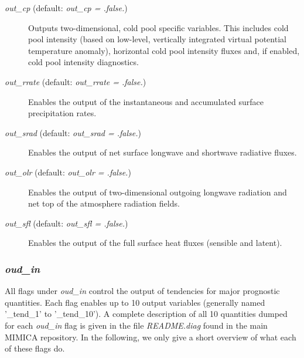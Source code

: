 \documentclass[12pt,A4,french]{article}
\begin{document}
\begin{description}
\item[{\it out\_cp} (default: {\it out\_cp = .false.})]

Outputs two-dimensional, cold pool specific variables. This includes cold pool intensity (based on low-level, vertically integrated virtual potential temperature anomaly), horizontal cold pool intensity fluxes and, if enabled, cold pool intensity diagnostics.

\item[{\it out\_rrate} (default: {\it out\_rrate = .false.})]

Enables the output of the instantaneous and accumulated surface precipitation rates. 

\item[{\it out\_srad} (default: {\it out\_srad = .false.})]

Enables the output of net surface longwave and shortwave radiative fluxes. 

\item[{\it out\_olr} (default: {\it out\_olr = .false.})]

Enables the output of two-dimensional outgoing longwave radiation and net top of the atmosphere radiation fields. 

\item[{\it out\_sfl} (default: {\it out\_sfl = .false.})]

Enables the output of the full surface heat fluxes (sensible and latent). 

\end{description}

\subsubsection{{\it oud\_in}}

All flags under {\it oud\_in} control the output of tendencies for major prognostic quantities. Each flag enables up to 10 output variables (generally named '\_tend\_1' to '\_tend\_10'). A complete description of all 10 quantities dumped for each  {\it oud\_in} flag is given in the file {\it README.diag} found in the main MIMICA repository. In the following, we only give a short overview of what each of these flags do.
\end{document}

